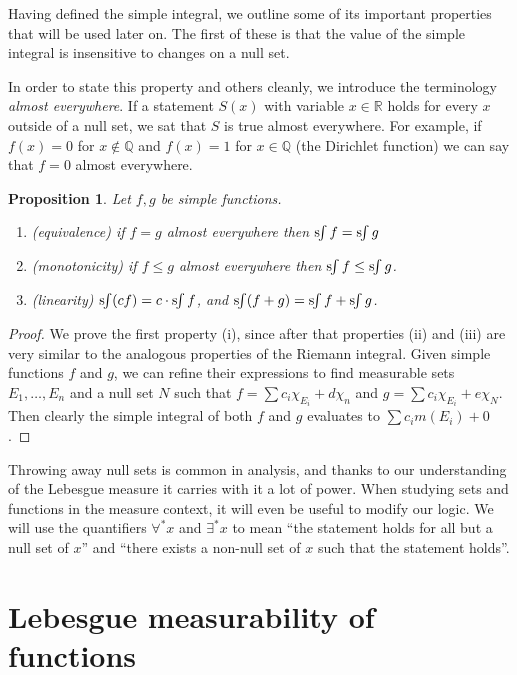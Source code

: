 \documentclass[11pt,oneside]{amsbook}
\newcommand{\QQ}{{\mathbb Q}}
\newcommand{\RR}{{\mathbb R}}
\newcommand{\sint}{\text{s}\kern-3pt\int}
\theoremstyle{definition}
\theoremstyle{plain}
\newtheorem{prop}[thm]{Proposition}
\theoremstyle{definition}
\theoremstyle{remark}
\numberwithin{equation}{section}
\numberwithin{figure}{section}
\begin{document}
Having defined the simple integral, we outline some of its important properties that will be used later on. The first of these is that the value of the simple integral is insensitive to changes on a null set.

In order to state this property and others cleanly, we introduce the terminology \emph{almost everywhere}. If a statement $S(x)$ with variable $x\in\RR$ holds for every $x$ outside of a null set, we sat that $S$ is true almost everywhere. For example, if $f(x)=0$ for $x\notin\QQ$ and $f(x)=1$ for $x\in\QQ$ (the Dirichlet function) we can say that $f=0$ almost everywhere.

\begin{prop}
  Let $f,g$ be simple functions.
  \begin{enumerate}
  \item (equivalence) if $f=g$ almost everywhere then $\sint f=\sint g$
  \item (monotonicity) if $f\leq g$ almost everywhere then $\sint f\leq\sint g$.
  \item (linearity) $\sint (cf)=c\cdot\sint f$, and $\sint (f+g)=\sint f+\sint g$.
  \end{enumerate}
\end{prop}

\begin{proof}
  We prove the first property (i), since after that properties (ii) and (iii) are very similar to the analogous properties of the Riemann integral. Given simple functions $f$ and $g$, we can refine their expressions to find measurable sets $E_1,\ldots,E_n$ and a null set $N$ such that $f=\sum c_i\chi_{E_i}+d\chi_n$ and $g=\sum c_i\chi_{E_i}+e\chi_N$. Then clearly the simple integral of both $f$ and $g$ evaluates to $\sum c_im(E_i)+0$.
\end{proof}

Throwing away null sets is common in analysis, and thanks to our understanding of the Lebesgue measure it carries with it a lot of power. When studying sets and functions in the measure context, it will even be useful to modify our logic. We will use the quantifiers $\forall^*x$ and $\exists^*x$ to mean ``the statement holds for all but a null set of $x$'' and ``there exists a non-null set of $x$ such that the statement holds''.


\section{Lebesgue measurability of functions}
\end{document}
